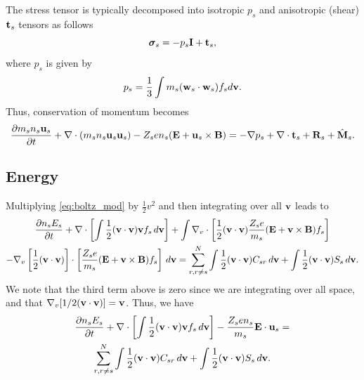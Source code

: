 \documentclass[a4paper,11pt]{report}
\begin{document}
The stress tensor is typically decomposed into isotropic $p_s$ and anisotropic (shear) $\mathbf{t}_s$ tensors as follows
\begin{equation}
\boldsymbol{\sigma}_s = - p_s \mathbf{I} + \mathbf{t}_s,
\end{equation}
where $p_s$ is given by
\begin{equation}
p_s = \frac{1}{3} \int m_s (\mathbf{w}_s \cdot \mathbf{w}_s) f_s d\mathbf{v}.
\end{equation}
Thus, conservation of momentum becomes
\begin{equation}
\label{eq:mom_derv_6}
\frac{\partial m_s n_s \mathbf{u}_s}{\partial t} + \nabla \cdot \left ( m_s n_s \mathbf{u}_s \mathbf{u}_s \right) - Z_s e n_s ( \mathbf{E} + \mathbf{u}_s \times \mathbf{B} ) = - \nabla p_s + \nabla \cdot \mathbf{t}_s + \mathbf{R}_s + \hat{\mathbf{M}}_s.
\end{equation}

\subsection{Energy}
Multiplying \cref{eq:boltz_mod} by $\frac{1}{2} v^2$ and then integrating over all $\mathbf{v}$ leads to
\begin{multline}
\label{eq:energy_derv_1}
\frac{\partial n_s E_s}{\partial t} + \nabla \cdot \left [ \int \frac{1}{2} (\mathbf{v} \cdot \mathbf{v}) \mathbf{v} f_s \, d\mathbf{v} \right ] + \int \nabla_v \cdot \left [ \frac{1}{2} (\mathbf{v} \cdot \mathbf{v}) \frac{Z_s e}{m_s} ( \mathbf{E} + \mathbf{v} \times \mathbf{B} ) f_s \right ] \\
- \nabla_v \left [ \frac{1}{2} (\mathbf{v} \cdot \mathbf{v}) \right ] \cdot \left [ \frac{Z_s e}{m_s} ( \mathbf{E} + \mathbf{v} \times \mathbf{B} ) f_s \right ] \, d\mathbf{v} = \sum_{r, r \ne s}^N \int \frac{1}{2} (\mathbf{v} \cdot \mathbf{v}) C_{s r} \, d\mathbf{v} + \int \frac{1}{2} (\mathbf{v} \cdot \mathbf{v}) S_s \, d\mathbf{v}.
\end{multline}
We note that the third term above is zero since we are integrating over all space, and that $\nabla_v [ 1/2 (\mathbf{v} \cdot \mathbf{v} ) ] = \mathbf{v}$. Thus, we have
\begin{multline}
\label{eq:energy_derv_2}
\frac{\partial n_s E_s}{\partial t} + \nabla \cdot \left [ \int \frac{1}{2} (\mathbf{v} \cdot \mathbf{v}) \mathbf{v} f_s \, d\mathbf{v} \right ] - \frac{Z_s e n_s}{m_s} \mathbf{E} \cdot \mathbf{u}_s =\\
\sum_{r, r \ne s}^N \int \frac{1}{2} (\mathbf{v} \cdot \mathbf{v}) C_{s r} \, d\mathbf{v} + \int \frac{1}{2} (\mathbf{v} \cdot \mathbf{v}) S_s \, d\mathbf{v}.
\end{multline}
\end{document}
